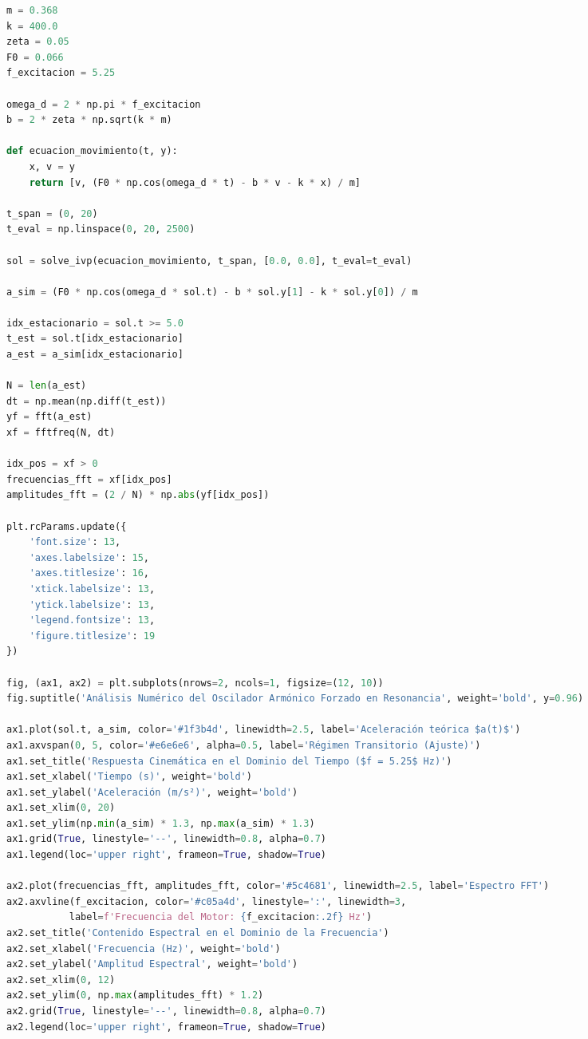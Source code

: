 \documentclass[10pt]{article}
\begin{document}
\begin{multicols}{2}
\begin{lstlisting}[language=Python, caption={Algoritmo de integración numérica y análisis espectral FFT en Python.}, label={code:simulacion_oscilador}]
m = 0.368          
k = 400.0          
zeta = 0.05        
F0 = 0.066         
f_excitacion = 5.25  

omega_d = 2 * np.pi * f_excitacion
b = 2 * zeta * np.sqrt(k * m)

def ecuacion_movimiento(t, y):
    x, v = y
    return [v, (F0 * np.cos(omega_d * t) - b * v - k * x) / m]

t_span = (0, 20)
t_eval = np.linspace(0, 20, 2500)  

sol = solve_ivp(ecuacion_movimiento, t_span, [0.0, 0.0], t_eval=t_eval)

a_sim = (F0 * np.cos(omega_d * sol.t) - b * sol.y[1] - k * sol.y[0]) / m

idx_estacionario = sol.t >= 5.0
t_est = sol.t[idx_estacionario]
a_est = a_sim[idx_estacionario]

N = len(a_est)
dt = np.mean(np.diff(t_est))
yf = fft(a_est)
xf = fftfreq(N, dt)

idx_pos = xf > 0
frecuencias_fft = xf[idx_pos]
amplitudes_fft = (2 / N) * np.abs(yf[idx_pos])

plt.rcParams.update({
    'font.size': 13,
    'axes.labelsize': 15,
    'axes.titlesize': 16,
    'xtick.labelsize': 13,
    'ytick.labelsize': 13,
    'legend.fontsize': 13,
    'figure.titlesize': 19
})

fig, (ax1, ax2) = plt.subplots(nrows=2, ncols=1, figsize=(12, 10))
fig.suptitle('Análisis Numérico del Oscilador Armónico Forzado en Resonancia', weight='bold', y=0.96)

ax1.plot(sol.t, a_sim, color='#1f3b4d', linewidth=2.5, label='Aceleración teórica $a(t)$')
ax1.axvspan(0, 5, color='#e6e6e6', alpha=0.5, label='Régimen Transitorio (Ajuste)')
ax1.set_title('Respuesta Cinemática en el Dominio del Tiempo ($f = 5.25$ Hz)')
ax1.set_xlabel('Tiempo (s)', weight='bold')
ax1.set_ylabel('Aceleración (m/s²)', weight='bold')
ax1.set_xlim(0, 20)
ax1.set_ylim(np.min(a_sim) * 1.3, np.max(a_sim) * 1.3)
ax1.grid(True, linestyle='--', linewidth=0.8, alpha=0.7)
ax1.legend(loc='upper right', frameon=True, shadow=True)

ax2.plot(frecuencias_fft, amplitudes_fft, color='#5c4681', linewidth=2.5, label='Espectro FFT')
ax2.axvline(f_excitacion, color='#c05a4d', linestyle=':', linewidth=3, 
           label=f'Frecuencia del Motor: {f_excitacion:.2f} Hz')
ax2.set_title('Contenido Espectral en el Dominio de la Frecuencia')
ax2.set_xlabel('Frecuencia (Hz)', weight='bold')
ax2.set_ylabel('Amplitud Espectral', weight='bold')
ax2.set_xlim(0, 12)  
ax2.set_ylim(0, np.max(amplitudes_fft) * 1.2)
ax2.grid(True, linestyle='--', linewidth=0.8, alpha=0.7)
ax2.legend(loc='upper right', frameon=True, shadow=True)


\end{lstlisting}
\end{multicols}
\end{document}
